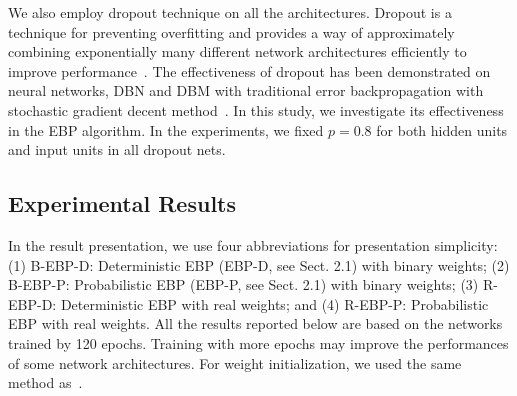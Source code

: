 \documentclass{article} %
\begin{document}
We also employ dropout technique on all the architectures. Dropout is a technique for preventing overfitting and provides a way of approximately combining exponentially many different network architectures efficiently to improve performance~\citep{srivastava2014dropout}. The effectiveness of dropout has been demonstrated on neural networks, DBN and DBM with traditional error backpropagation with stochastic gradient decent method~\citep{srivastava2014dropout}. In this study, we investigate its effectiveness in the EBP algorithm. In the experiments, we fixed $p=0.8$  for both hidden units and input units in all dropout nets.

\subsection{Experimental Results}
In the result presentation, we use four abbreviations for presentation simplicity: (1) B-EBP-D:  Deterministic EBP (EBP-D, see Sect. 2.1) with binary weights;  (2) B-EBP-P: Probabilistic EBP (EBP-P, see Sect. 2.1) with binary weights; (3) R-EBP-D: Deterministic EBP with real weights; and (4) R-EBP-P: Probabilistic EBP with real weights. All the results reported below are based on the networks trained by 120 epochs.  Training with more epochs may improve the performances of some network architectures. For weight initialization, we used the same method as~\citet{Soudry14}.
\end{document}
